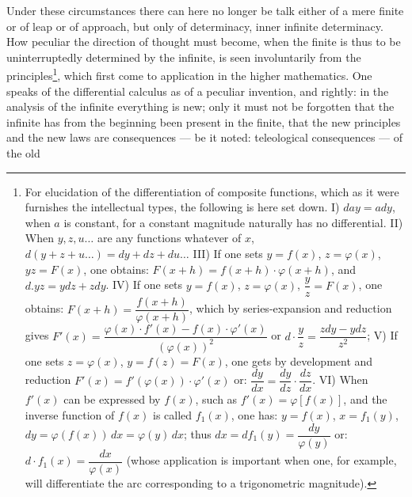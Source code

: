 \documentclass[12pt]{book}
\begin{document}
Under these circumstances there can here no longer be talk either of a mere finite or
of leap or of approach, but only of determinacy, inner infinite determinacy.
How peculiar the direction of thought must become, when the finite is thus to be
uninterruptedly determined by the infinite, is seen involuntarily from the
principles\footnote{For elucidation of the differentiation of composite functions,
which as it were furnishes the intellectual types, the following is here set down.
I) $day = ady$, when $a$ is constant, for a constant magnitude naturally has no
differential. II) When $y, z, u \dots$ are any functions whatever of $x$,
$d(y + z + u \dots) = dy + dz + du \dots$ III) If one sets $y = f(x)$,
$z = \varphi(x)$, $yz = F(x)$, one obtains: $F(x + h) = f(x + h)\cdot\varphi(x + h)$,
and $d.yz = ydz + zdy$. IV) If one sets $y = f(x)$, $z = \varphi(x)$,
$\dfrac{y}{z} = F(x)$, one obtains: $F(x + h) = \dfrac{f(x + h)}{\varphi(x + h)}$,
which by series-expansion and reduction gives
$F'(x) = \dfrac{\varphi(x)\cdot f'(x) - f(x)\cdot\varphi'(x)}{(\varphi(x))^{2}}$
or $d\cdot\dfrac{y}{z} = \dfrac{zdy - ydz}{z^{2}}$; V) If one sets $z = \varphi(x)$,
$y = f(z) = F(x)$, one gets by development and reduction
$F'(x) = f'(\varphi(x))\cdot\varphi'(x)$ or:
$\dfrac{dy}{dx} = \dfrac{dy}{dz}\cdot\dfrac{dz}{dx}$. VI) When $f'(x)$ can be expressed
by $f(x)$, such as $f'(x) = \varphi[f(x)]$, and the inverse function of $f(x)$ is
called $f_{1}(x)$, one has: $y = f(x)$, $x = f_{1}(y)$,
$dy = \varphi(f(x))\,dx = \varphi(y)\,dx$; thus
$dx = d f_{1}(y) = \dfrac{dy}{\varphi(y)}$ or:
$d\cdot f_{1}(x) = \dfrac{dx}{\varphi(x)}$ (whose application is important when one,
for example, will differentiate the arc corresponding to a trigonometric
magnitude).}, which first come to application in the higher mathematics. One speaks
of the differential calculus as of a peculiar invention, and rightly: in the analysis
of the infinite everything is new; only it must not be forgotten that the infinite
has from the beginning been present in the finite, that the new principles and the new
laws are consequences --- be it noted: teleological consequences --- of the old
\end{document}
